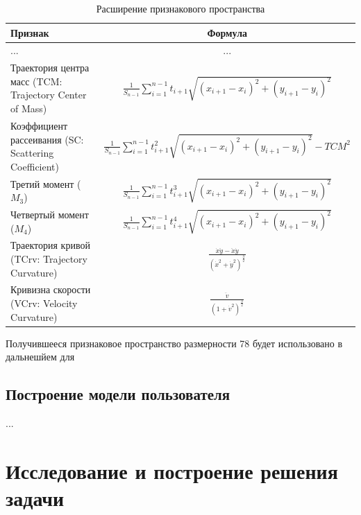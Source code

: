 \documentclass[12pt]{article}
\begin{document}
    \begin{table}[h]
        \centering
        \tiny
        \renewcommand{\arraystretch}{3.0}
        \renewcommand{\tabcolsep}{2mm}
        \begin{tabular}{ || l | c ||}
            \hline
            \normalsize Признак & \normalsize Формула \\ [3mm] \hline
            ... & ... \\ \hline
            Траектория центра масс (TCM: Trajectory Center of Mass) & $ \frac{1}{S_{n-1}} \sum_{i=1}^{n-1} t_{i+1} \sqrt{(x_{i+1} - x_{i})^2 + (y_{i+1} - y_i)^2} $ \\ \hline
            Коэффициент рассеивания (SC: Scattering Coefficient) &  $ \frac{1}{S_{n-1}} \sum_{i=1}^{n-1} t_{i+1}^2 \sqrt{(x_{i+1} - x_{i})^2 + (y_{i+1} - y_i)^2} - TCM^2 $ \\ \hline
            Третий момент ($M_3$) & $ \frac{1}{S_{n-1}} \sum_{i=1}^{n-1} t_{i+1}^3 \sqrt{(x_{i+1} - x_{i})^2 + (y_{i+1} - y_i)^2} $ \\ \hline
            Четвертый момент ($M_4$) & $ \frac{1}{S_{n-1}} \sum_{i=1}^{n-1} t_{i+1}^4 \sqrt{(x_{i+1} - x_{i})^2 + (y_{i+1} - y_i)^2} $ \\ \hline
            Траектория кривой (TCrv: Trajectory Curvature) & $ \frac{\dot{x}\ddot{y} - \ddot{x}\dot{y}}{(\dot{x}^2 + \dot{y}^2)^\frac{3}{2}} $ \\ \hline
            Кривизна скорости (VCrv: Velocity Curvature) & $ \frac{\ddot{v}}{(1 + \dot{v}^2)^\frac{3}{2}} $ \\ \hline
        \end{tabular}
        \caption{Расширение признакового пространства}
        \label{sec:Overview:Features:table:ArsFeaturesFormulas}
    \end{table}

    \noindent Получившееся признаковое пространство размерности 78 будет использовано в дальнешйем для 

    \newpage


    \subsection{Построение модели пользователя}
    \label{sec:Overview:Model}

    ...

    \newpage



    \section{Исследование и построение решения задачи}
    \label{sec:Research}
    
\end{document}
